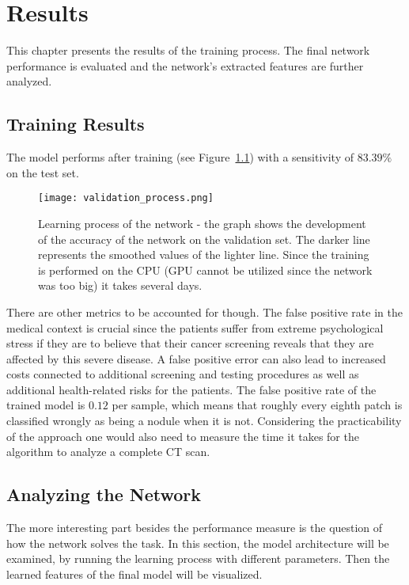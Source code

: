 \documentclass[main.tex]{subfiles}
\begin{document}
\chapter{Results}\label{chap:results}
This chapter presents the results of the training process. The final network performance is evaluated and the network's extracted features are further analyzed.

\section{Training Results}
The model performs after training (see Figure~\ref{fig:validation}) with a sensitivity of $83.39\%$ on the test set.

\begin{figure}[H]
\begin{center}
\texttt{[image: validation\_process.png]}
\end{center}
\caption{Learning process of the network - the graph shows the development of the accuracy of the network on the validation set. The darker line represents the smoothed values of the lighter line. Since the training is performed on the CPU (GPU cannot be utilized since the network was too big) it takes several days.}
\label{fig:validation}
\end{figure}

There are other metrics to be accounted for though. The false positive rate in the medical context is crucial since the patients suffer from extreme psychological stress if they are to believe that their cancer screening reveals that they are affected by this severe disease. A false positive error can also lead to increased costs connected to additional screening and testing procedures as well as additional health-related risks for the patients. The false positive rate of the trained model is $0.12$ per sample, which means that roughly every eighth patch is classified wrongly as being a nodule when it is not. Considering the practicability of the approach one would also need to measure the time it takes for the algorithm to analyze a complete CT scan.


\section{Analyzing the Network}
The more interesting part besides the performance measure is the question of how the network solves the task. In this section, the model architecture will be examined, by running the learning process with different parameters. Then the learned features of the final model will be visualized.
\end{document}
